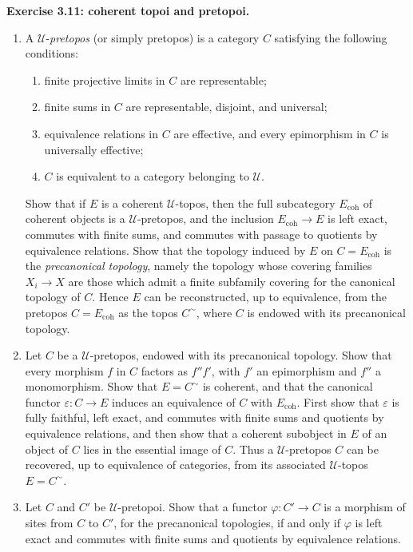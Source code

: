 \documentclass[11pt]{article}
\newcommand{\U}{\mathcal{U}}
\newcommand{\coh}{\mathrm{coh}}
\newenvironment{remarktext}[1]{\par\medskip\noindent\textbf{#1.}\ }{\par\medskip}
\begin{document}
\begin{remarktext}{Exercise 3.11: coherent topoi and pretopoi}
\begin{enumerate}[label=\alph*)]
\item A \(\U\)-\emph{pretopos} (or simply pretopos) is a category \(C\) satisfying the following conditions:
\begin{enumerate}[label=\arabic*)]
\item finite projective limits in \(C\) are representable;
\item finite sums in \(C\) are representable, disjoint, and universal;
\item equivalence relations in \(C\) are effective, and every epimorphism in \(C\) is universally effective;
\item \(C\) is equivalent to a category belonging to \(\U\).
\end{enumerate}
Show that if \(E\) is a coherent \(\U\)-topos, then the full subcategory \(E_{\coh}\) of coherent objects is a \(\U\)-pretopos, and the inclusion \(E_{\coh}\to E\) is left exact, commutes with finite sums, and commutes with passage to quotients by equivalence relations. Show that the topology induced by \(E\) on \(C=E_{\coh}\) is the \emph{precanonical topology}, namely the topology whose covering families \(X_i\to X\) are those which admit a finite subfamily covering for the canonical topology of \(C\). Hence \(E\) can be reconstructed, up to equivalence, from the pretopos \(C=E_{\coh}\) as the topos \(C^{\sim}\), where \(C\) is endowed with its precanonical topology.

\item Let \(C\) be a \(\U\)-pretopos, endowed with its precanonical topology. Show that every morphism \(f\) in \(C\) factors as \(f''f'\), with \(f'\) an epimorphism and \(f''\) a monomorphism. Show that \(E=C^{\sim}\) is coherent, and that the canonical functor \(\varepsilon:C\to E\) induces an equivalence of \(C\) with \(E_{\coh}\). First show that \(\varepsilon\) is fully faithful, left exact, and commutes with finite sums and quotients by equivalence relations, and then show that a coherent subobject in \(E\) of an object of \(C\) lies in the essential image of \(C\). Thus a \(\U\)-pretopos \(C\) can be recovered, up to equivalence of categories, from its associated \(\U\)-topos \(E=C^{\sim}\).

\item Let \(C\) and \(C'\) be \(\U\)-pretopoi. Show that a functor \(\varphi:C'\to C\) is a morphism of sites from \(C\) to \(C'\), for the precanonical topologies, if and only if \(\varphi\) is left exact and commutes with finite sums and quotients by equivalence relations.


\end{enumerate}
\end{remarktext}
\end{document}
